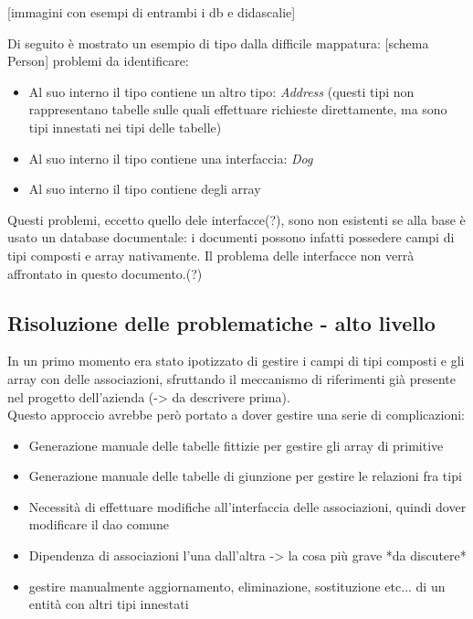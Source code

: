 \documentclass[a4paper, 12pt]{scrartcl}
\begin{document}
      [immagini con esempi di entrambi i db e didascalie]

      Di seguito è mostrato un esempio di tipo dalla difficile mappatura:
      [schema Person]
      problemi da identificare:
      \begin{itemize}
        \item Al suo interno il tipo contiene un altro tipo: \emph{Address} (questi tipi non rappresentano tabelle sulle quali effettuare richieste direttamente, ma sono tipi innestati nei tipi delle tabelle)
        \item Al suo interno il tipo contiene una interfaccia: \emph{Dog}
        \item Al suo interno il tipo contiene degli array
      \end{itemize}

      Questi problemi, eccetto quello dele interfacce(?), sono non esistenti se alla base è usato un database documentale: i documenti possono infatti possedere campi di tipi composti e array nativamente. 
      Il problema delle interfacce non verrà affrontato in questo documento.(?)
      \newpage
    \subsection*{Risoluzione delle problematiche - alto livello}
      In un primo momento era stato ipotizzato di gestire i campi di tipi composti e gli array con delle associazioni, sfruttando il meccanismo di riferimenti già presente nel progetto dell'azienda (-> da descrivere prima).\\
      Questo approccio avrebbe però portato a dover gestire una serie di complicazioni:
        \begin{itemize}
          \item Generazione manuale delle tabelle fittizie per gestire gli array di primitive
          \item Generazione manuale delle tabelle di giunzione per gestire le relazioni fra tipi
          \item Necessità di effettuare modifiche all'interfaccia delle associazioni, quindi dover modificare il dao comune
          \item Dipendenza di associazioni l'una dall'altra -> la cosa più grave *da discutere*
          \item gestire manualmente aggiornamento, eliminazione, sostituzione etc... di un entità con altri tipi innestati
        \end{itemize}
      
\end{document}
